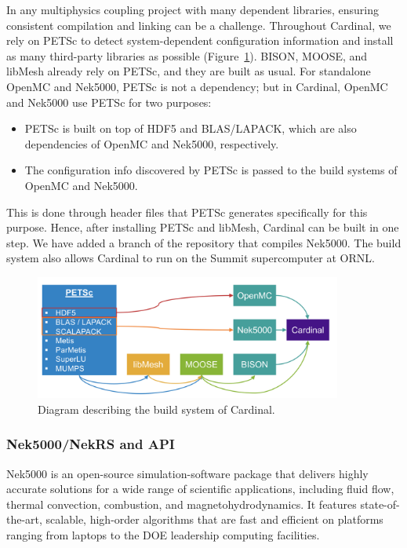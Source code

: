 In any multiphysics coupling project with many dependent libraries, ensuring consistent compilation and linking can be a challenge. Throughout Cardinal, we rely on PETSc to detect system-dependent configuration information and install as many third-party libraries as possible (Figure~\ref{f:build}). BISON, MOOSE, and libMesh already rely on PETSc, and they are built as usual. For standalone OpenMC and
Nek5000, PETSc is not a dependency; but in Cardinal, OpenMC and Nek5000 use PETSc for two purposes:
\begin{itemize}
\item PETSc is built on top of HDF5 and BLAS/LAPACK, which are also dependencies of OpenMC and Nek5000, respectively.
\item The configuration info discovered by PETSc is passed to the build systems of OpenMC and Nek5000.
\end{itemize}
This is done through header files that PETSc generates specifically for this purpose. Hence, after installing PETSc and libMesh, Cardinal can be built in one step.
We have added a branch of the repository that compiles Nek5000. The build system also allows Cardinal to run on the Summit supercomputer at ORNL.
\begin{figure}[!h]
\centering
\includegraphics[clip=true,width=0.9\textwidth]{Figures/build}
\caption{Diagram describing the build system of Cardinal.}
\label{f:build}
\end{figure}

\subsubsection{Nek5000/NekRS and API}

Nek5000 \cite{fischer2015nek5000} is an open-source simulation-software package that delivers highly 
accurate solutions for a wide range of scientific applications, including fluid flow, thermal convection, 
combustion, and magnetohydrodynamics. It features state-of-the-art, scalable, high-order algorithms that 
are fast and efficient on platforms ranging from laptops to the DOE leadership computing facilities.


